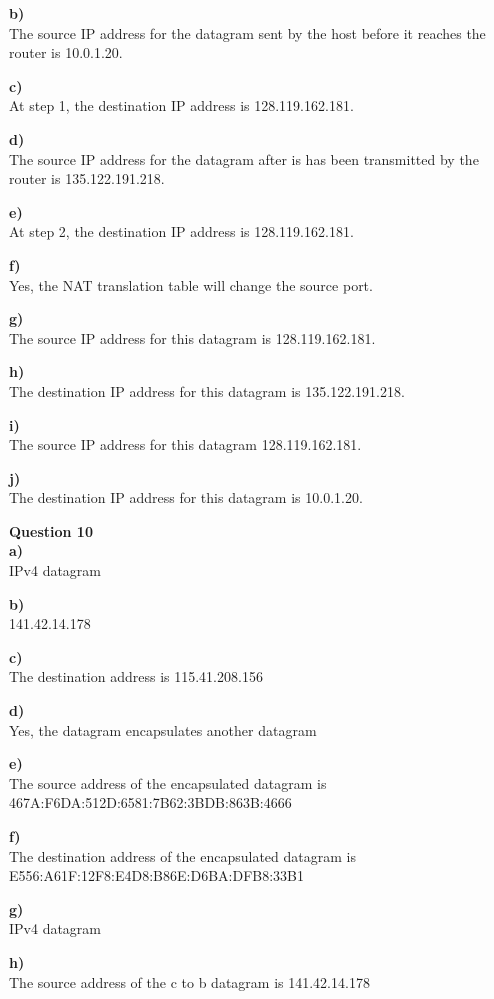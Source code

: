 \documentclass{article}
\begin{document}
{\bf b)}\\
The source IP address for the datagram sent by the host before it reaches the router is 10.0.1.20.

{\bf c)}\\
At step 1, the destination IP address is 128.119.162.181.

{\bf d)}\\
The source IP address for the datagram after is has been transmitted by the router is 135.122.191.218.

{\bf e)}\\
At step 2, the destination IP address is 128.119.162.181.

{\bf f)}\\
Yes, the NAT translation table will change the source port.

{\bf g)}\\
The source IP address for this datagram is 128.119.162.181.

{\bf h)}\\
The destination IP address for this datagram is 135.122.191.218.

{\bf i)}\\
The source IP address for this datagram 128.119.162.181.

{\bf j)}\\
The destination IP address for this datagram is 10.0.1.20.

\bigskip
{\bf Question 10}\\
{\bf a)}\\
IPv4 datagram

{\bf b)}\\
141.42.14.178

{\bf c)}\\
The destination address is 115.41.208.156

{\bf d)}\\
Yes, the datagram encapsulates another datagram

{\bf e)}\\
The source address of the encapsulated datagram is 467A:F6DA:512D:6581:7B62:3BDB:863B:4666

{\bf f)}\\
The destination address of the encapsulated datagram is E556:A61F:12F8:E4D8:B86E:D6BA:DFB8:33B1

{\bf g)}\\
IPv4 datagram

{\bf h)}\\
The source address of the c to b datagram is 141.42.14.178
\end{document}
